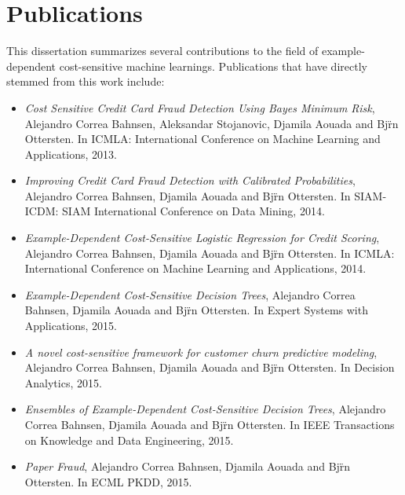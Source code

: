 \chapter*{Publications}
This dissertation summarizes several contributions to the field of example-dependent 
cost-sensitive machine learnings. Publications that have directly stemmed from this work 
include:
\bigskip

\begin{itemize}
\item \citep{CorreaBahnsen2013} \textit{Cost Sensitive Credit Card Fraud Detection Using Bayes 
Minimum Risk},
Alejandro Correa Bahnsen,  Aleksandar Stojanovic, Djamila Aouada and Bj\"rn Ottersten.
In ICMLA: International Conference on Machine Learning and Applications, 2013.

\item \citep{CorreaBahnsen2014} \textit{Improving Credit Card Fraud Detection with Calibrated 
Probabilities},
Alejandro Correa Bahnsen, Djamila Aouada and Bj\"rn Ottersten.
In SIAM-ICDM: SIAM International Conference on Data Mining, 2014.

\item \citep{CorreaBahnsen2014b} \textit{Example-Dependent Cost-Sensitive Logistic Regression for 
Credit Scoring},
Alejandro Correa Bahnsen, Djamila Aouada and Bj\"rn Ottersten.
In ICMLA: International Conference on Machine Learning and Applications, 2014.

\item \citep{CorreaBahnsen2015} \textit{Example-Dependent Cost-Sensitive Decision Trees},
Alejandro Correa Bahnsen, Djamila Aouada and Bj\"rn Ottersten.
In Expert Systems with Applications, 2015.

\item \citep{CorreaBahnsen2015a} \textit{A novel cost-sensitive framework for customer churn 
predictive modeling},
Alejandro Correa Bahnsen, Djamila Aouada and Bj\"rn Ottersten.
In Decision Analytics, 2015.

\item \citep{CorreaBahnsen2015b} \textit{Ensembles of Example-Dependent Cost-Sensitive Decision 
Trees},
Alejandro Correa Bahnsen, Djamila Aouada and Bj\"rn Ottersten.
In IEEE Transactions on Knowledge and Data Engineering, 2015.

\item \citep{CorreaBahnsen2015c} \textit{Paper Fraud},
Alejandro Correa Bahnsen, Djamila Aouada and Bj\"rn Ottersten.
In ECML PKDD, 2015.

\end{itemize}